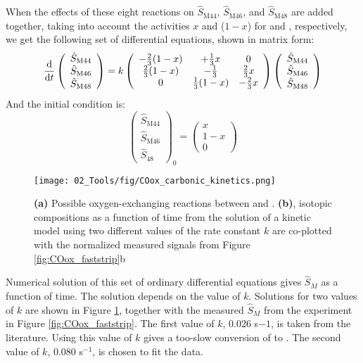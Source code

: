 When the effects of these eight reactions on $\hat{S}_\text{M44}$, $\hat{S}_\text{M46}$, and $\hat{S}_\text{M48}$ are added together, taking into account the activities $x$ and ($1-x$) for  and , respectively, we get the following set of differential equations, shown in matrix form:
\begin{equation}
\frac{\mathrm{d}}{\mathrm{d} t} \left( \begin{array}{c}  \hat{S}_\text{M44} \\ \hat{S}_\text{M46}\\ \hat{S}_\text{M48} 
\end{array}  \right) = k \left( \begin{array}{c c c}   -\frac{2}{3}(1-x) & + \frac{1}{3}x & 0 \\  \frac{2}{3}(1-x) & -\frac{1}{3} & \frac{2}{3}x \\  0 & \frac{1}{3}(1-x) & -\frac{2}{3}x
\end{array}  \right) \left(\begin{array}{c}  \hat{S}_\text{M44} \\ \hat{S}_\text{M46}\\ \hat{S}_\text{M48} 
\end{array}  \right)
\end{equation}
And the initial condition is:
\begin{equation}
\left(\begin{array}{c}  \hat{S}_\text{M44} \\ \hat{S}_\text{M46}\\ \hat{S}_\text{48} 
\end{array}  \right)_0 = \left(\begin{array}{c}  x \\ 1-x \\ 0 
\end{array}  \right)
\end{equation}
\begin{figure}[h!]
	\centering
	\texttt{[image: 02\_Tools/fig/COox\_carbonic\_kinetics.png]}
	\caption{\textbf{(a)} Possible oxygen-exchanging reactions between  and . \textbf{(b)},  isotopic compositions as a function of time from the solution of a kinetic model using two different values of the rate constant $k$ are co-plotted with the normalized measured  signals from Figure \ref{fig:COox_faststrip}b}
	\label{fig:carbonic_kinetics}
\end{figure}
Numerical solution of this set of ordinary differential equations gives $\hat{S}_M$ as a function of time. The solution depends on the value of $k$. Solutions for two values of $k$ are shown in Figure \ref{fig:carbonic_kinetics}, together with the measured $\hat{S}_M$ from the experiment in Figure \ref{fig:COox_faststrip}. The first value of $k$, 0.026 s${-1}$, is taken from the literature\cite{Pinsent1956}. Using this value of $k$ gives a too-slow conversion of  to . The second value of $k$, 0.080 s$^{-1}$, is chosen to fit the data. 

